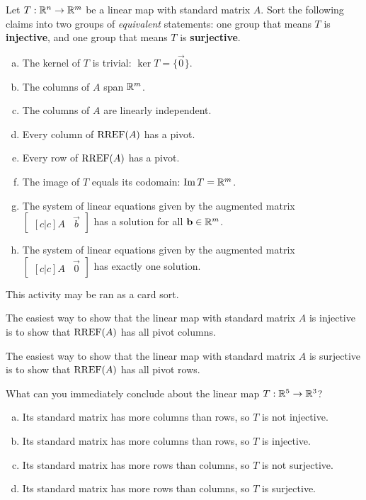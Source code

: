 \begin{applicationActivities}
\begin{activity}{15}
Let $T: \mathbb{R}^n \rightarrow \mathbb{R}^m$ be a linear map with standard matrix $A$.
Sort the following claims into two groups of \textit{equivalent} statements:
one group that means \(T\) is \textbf{injective}, and one group that means
\(T\) is \textbf{surjective}.
\begin{multicols}{2}
\begin{enumerate}[(a)]
\item The kernel of \(T\) is trivial: \(\ker T=\{\vec 0\}\).
\item The columns of $A$ span $\mathbb{R}^m$.
\item The columns of $A$ are linearly independent.
\item Every column of $\operatorname{RREF}(A)$ has a pivot.
\item Every row of $\operatorname{RREF}(A)$ has a pivot.
\item The image of \(T\) equals its codomain: \(\operatorname{Im} T=\mathbb{R}^m\).
\item The system of linear equations given by the augmented matrix $\begin{bmatrix}[c|c]A & \vec{b} \end{bmatrix}$ has a solution for all $\mathbf{b} \in \mathbb{R}^m$.
\item The system of linear equations given by the augmented matrix $\begin{bmatrix}[c|c] A & \vec{0} \end{bmatrix}$ has exactly one solution.
\end{enumerate}
\end{multicols}
\begin{instructorNote}
  This activity may be ran as a card sort.
\end{instructorNote}
\end{activity}

\begin{observation}
  The easiest way to show that the linear map with standard matrix \(A\)
  is injective is to show that \(\operatorname{RREF}(A)\) has all pivot columns.

  \vspace{1em}

  The easiest way to show that the linear map with standard matrix \(A\)
  is surjective is to show that \(\operatorname{RREF}(A)\) has all pivot rows.
\end{observation}

\begin{activity}{3}
  What can you immediately conclude about the linear map \(T:\mathbb{R}^5\to\mathbb{R}^3\)?
  \begin{enumerate}[a)]
    \item Its standard matrix has more columns than rows, so \(T\) is not
    injective.
    \item Its standard matrix has more columns than rows, so \(T\) is
    injective.
    \item Its standard matrix has more rows than columns, so \(T\) is not
    surjective.
    \item Its standard matrix has more rows than columns, so \(T\) is
    surjective.
  \end{enumerate}
\end{activity}


\end{applicationActivities}
